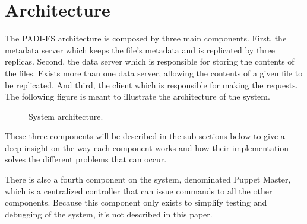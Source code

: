 \section{Architecture}

The PADI-FS architecture is composed by three main components. First, the
metadata server which keeps the file's metadata and is replicated by three
replicas. Second, the data server which is responsible for storing the contents
of the files. Exists more than one data server, allowing the contents of
a given file to be replicated. And third, the client which is responsible for
making the requests.\\

The following figure is meant to illustrate the architecture of the system.\\

\begin{figure}[H]
  	\caption{System architecture.}
\end{figure}

These three components will be described in the sub-sections below to give
a deep insight on the way each component works and how their implementation
solves the different problems that can occur.

There is also a fourth component on the system, denominated Puppet Master,
which is a centralized controller that can issue commands to all the other
components. Because this component only exists to simplify testing and
debugging of the system, it's not described in this paper.





